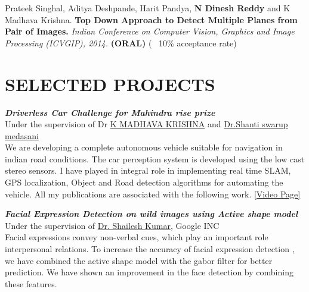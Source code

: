 \documentclass[a4paper,10pt]{article}
\begin{document}
 Prateek Singhal, Aditya Deshpande, Harit Pandya, \textbf{N Dinesh Reddy} and K Madhava Krishna. \textbf{Top Down Approach to Detect Multiple Planes from Pair of Images.} {\sl Indian Conference on Computer Vision, Graphics and Image Processing (ICVGIP), 2014.} \textbf{(ORAL)}  (~ 10\% acceptance rate)
 
\newpage
 
 \section{SELECTED PROJECTS} 
 {\sl \textbf{Driverless Car Challenge for Mahindra rise prize}}\\
 Under the supervision of Dr \href{https://www.iiit.ac.in/people/faculty/mkrishna/} {K MADHAVA \textsc{KRISHNA}} and \href{https://www.linkedin.com/in/shanthi-swaroop-e-1b953527}{Dr.Shanti swarup medasani}  \\
 We are developing a complete autonomous vehicle suitable for navigation in indian road conditions. The car perception system is developed using the low cast stereo sensors. I have played in integral role in implementing real time SLAM, GPS localization, Object and Road detection algorithms for automating the vehicle. All my publications are associated with the following work. \href{https://www.youtube.com/playlist?list=PLemkgppNt5fqMpV24R32fbYjRsfz-Fjgm} {[Video Page]} 
 
{\sl \textbf{Facial Expression Detection on wild images using Active shape model}}\\
Under the supervision of \href{http://research.google.com/pubs/ShaileshKumar.html}{Dr. Shailesh Kumar}, Google INC  \\
Facial expressions convey non-verbal cues, which play an important role interpersonal relations. To increase the accuracy of facial expression detection , we have combined the active shape model with the gabor filter for better prediction. We have shown an improvement in the face detection by combining these features.\\

\end{document}
